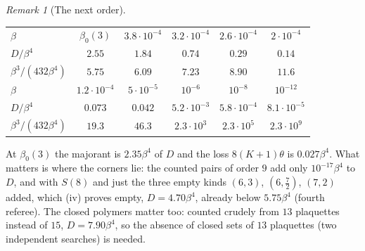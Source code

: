 \documentclass[11pt,a4paper]{article}
\theoremstyle{definition}
\theoremstyle{remark}
\newtheorem{remark}[theorem]{Remark}
\begin{document}
\begin{remark}[The next order]
\smallskip
\begin{center}
\begin{tabular}{lccccc}
\toprule
$\beta$ & $\beta_0(3)$ & $3.8\cdot10^{-4}$ & $3.2\cdot10^{-4}$ & $2.6\cdot10^{-4}$ & $2\cdot10^{-4}$\\
$D/\beta^4$ & $2.55$ & $1.84$ & $0.74$ & $0.29$ & $0.14$\\
$\beta^3/(432\beta^4)$ & $5.75$ & $6.09$ & $7.23$ & $8.90$ & $11.6$\\
\midrule
$\beta$ & $1.2\cdot10^{-4}$ & $5\cdot10^{-5}$ & $10^{-6}$ & $10^{-8}$ & $10^{-12}$\\
$D/\beta^4$ & $0.073$ & $0.042$ & $5.2\cdot10^{-3}$ & $5.8\cdot10^{-4}$ & $8.1\cdot10^{-5}$\\
$\beta^3/(432\beta^4)$ & $19.3$ & $46.3$ & $2.3\cdot10^3$ & $2.3\cdot10^5$ & $2.3\cdot10^9$\\
\bottomrule
\end{tabular}
\end{center}
\smallskip

\noindent At $\beta_0(3)$ the majorant is $2.35\beta^4$ of $D$ and the loss $8(K+1)\theta$ is $0.027\beta^4$. What matters is where the corners lie: the counted
pairs of order $9$ add only $10^{-17}\beta^4$ to $D$, and with $S(8)$ and just the three empty kinds $(6,3)$, $(6,\frac72)$, $(7,2)$ added, which (iv) proves empty, $D=4.70\beta^4$, already below $5.75\beta^4$
(fourth referee). The closed polymers matter too: counted crudely from $13$ plaquettes instead of $15$, $D=7.90\beta^4$, so the absence of closed sets of $13$ plaquettes (two independent
searches) is needed.


\end{remark}
\end{document}
